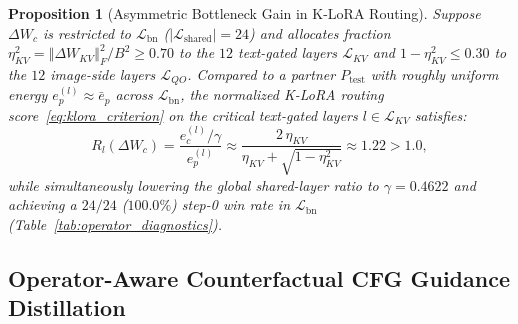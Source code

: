 \documentclass[10pt,twocolumn,letterpaper]{article}
\newtheorem{proposition}{Proposition}
\newcommand{\fnorm}[1]{\left\Vert #1 \right\Vert_F}
\begin{document}
\begin{proposition}[Asymmetric Bottleneck Gain in K-LoRA Routing]
\label{prop:klora_gain}
Suppose $\Delta W_c$ is restricted to $\mathcal{L}_{\text{bn}}$ ($|\mathcal{L}_{\text{shared}}| = 24$) and allocates fraction $\eta_{KV}^2 = \fnorm{\Delta W_{KV}}^2 / B^2 \ge 0.70$ to the $12$ text-gated layers $\mathcal{L}_{KV}$ and $1 - \eta_{KV}^2 \le 0.30$ to the $12$ image-side layers $\mathcal{L}_{QO}$. Compared to a partner $P_{\text{test}}$ with roughly uniform energy $e_p^{(l)} \approx \bar{e}_p$ across $\mathcal{L}_{\text{bn}}$, the normalized K-LoRA routing score~\eqref{eq:klora_criterion} on the critical text-gated layers $l \in \mathcal{L}_{KV}$ satisfies:
\begin{equation}
    R_l(\Delta W_c) = \frac{e_c^{(l)} / \gamma}{e_p^{(l)}} \approx \frac{2\,\eta_{KV}}{\eta_{KV} + \sqrt{1 - \eta_{KV}^2}} \approx 1.22 > 1.0,
    \label{eq:klora_asym_boost}
\end{equation}
while simultaneously lowering the global shared-layer ratio to $\gamma = 0.4622$ and achieving a $24/24$ ($100.0\%$) step-0 win rate in $\mathcal{L}_{\text{bn}}$ (Table~\ref{tab:operator_diagnostics}).
\end{proposition}

\subsection{Operator-Aware Counterfactual CFG Guidance Distillation}
\label{subsec:counterfactual_distill}
\end{document}
